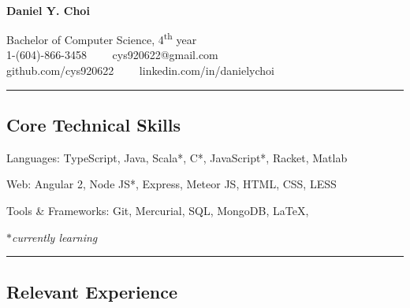 \documentclass[10pt,letterpaper]{article}
\newenvironment{indentsection}[1]%
{\begin{list}{}%
	{\setlength{\leftmargin}{#1}}%
	\item[]%
}
{\end{list}}
\newcommand{\CPP}
{C\nolinebreak[4]\hspace{-.05em}\raisebox{.22ex}{\footnotesize\bf ++}}
\begin{document}

\begin{center}
\thispagestyle{firststyle}
{\LARGE \textbf{\\Daniel Y. Choi}}

Bachelor of Computer Science, 4\textsuperscript{th} year
\\
1-(604)-866-3458\ \ \textbullet
\ \ cys920622@gmail.com
\\
github.com/cys920622\ \ \textbullet
\ \ linkedin.com/in/danielychoi
\end{center}

\hrule
\vspace{-0.4em}

\subsection*{Core Technical Skills}

\begin{indentsection}{\parindent}
\begin{description*}
	\item[Languages:]
	TypeScript, Java, Scala*, \CPP*, JavaScript*, Racket, Matlab
	\item[Web:]
	Angular 2, Node JS*, Express, Meteor JS, HTML, CSS, LESS
	\item[Tools \& Frameworks:]
	Git, Mercurial, SQL, MongoDB, \LaTeX, 
\end{description*}
\hfill{\emph{$\ast$currently learning}}
\end{indentsection}


\hrule
\vspace{-0.4em}

\subsection*{Relevant Experience}
\end{document}
